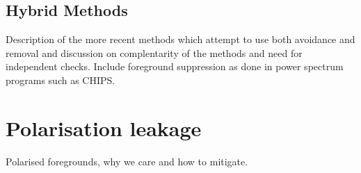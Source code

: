 \subsection{Hybrid Methods}
Description of the more recent methods which attempt to use both
avoidance and removal and discussion on complentarity of the methods
and need for independent checks. Include foreground suppression as
done in power spectrum programs such as CHIPS.

\section{Polarisation leakage}
Polarised foregrounds, why we care and how to mitigate.






